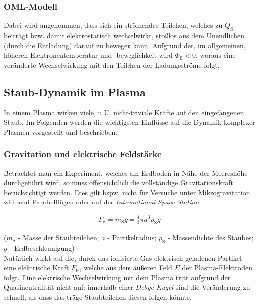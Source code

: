 \documentclass[numbers=noenddot,a4paper]{scrartcl}
\newcommand{\ix}[1]{_\text{#1}}
\newcommand{\tilt}[1]{\textit{#1}}
\begin{document}
		\subsubsection*{OML-Modell}
			
		Dabei wird angenommen, dass sich ein strömendes Teilchen, welches zu $Q\ix{S}$ beiträgt bzw. damit elektrostatisch wechselwirkt, stoßlos aus dem Unendlichen (durch die Entladung) darauf zu bewegen kann. Aufgrund der, im allgemeinen, höheren Elektronentemperatur und -beweglichkeit wird $\Phi\ix{fl}<0$, woraus eine veränderte Wechselwirkung mit den Teilchen der Ladungsströme folgt.
	
		\subsection{Staub-Dynamik im Plasma}\label{subsec:dynamik}
		
				In einem Plasma wirken viele, u.U. nicht-triviale Kräfte auf den eingefangenen Staub. Im Folgenden werden die wichtigsten Einflüsse auf die Dynamik komplexer Plasmen vorgestellt und beschrieben.\\
				
				\subsubsection{Gravitation und elektrische Feldstärke}\label{subsub:grav}
				
				Betrachtet man ein Experiment, welches am Erdboden in Nähe der Meereshöhe durchgeführt wird, so muss offensichtlich die vollständige Gravitationskraft berücksichtigt werden. Dies gilt bspw. nicht für Versuche unter Mikrogravitation während Parabelflügen oder auf der \tilt{International Space Station}.
				
					\begin{align}
						F\ix{g}=m\ix{S} g=\frac{4}{3}\pi a^3 \rho\ix{S} g
					\end{align}
				
				($m\ix{S}$ - Masse der Staubteilchen; $a$ - Partikelradius; $\rho\ix{S}$ - Massendichte des Staubes; $g$ - \mbox{Erdbeschleunigung})\\
				Natürlich wirkt auf die, durch das ionisierte Gas elektrisch geladenen Partikel eine elektrische Kraft $F\ix{E}$, welche aus dem äußeren Feld $E$ der Plasma-Elektroden folgt. Eine elektrische Wechselwirkung mit dem Plasma tritt aufgrund der Quasineutralität nicht auf: innerhalb einer \tilt{Debye-Kugel} sind die Veränderung zu schnell, als dass das träge Staubteilchen diesen folgen könnte. 
				
\end{document}
